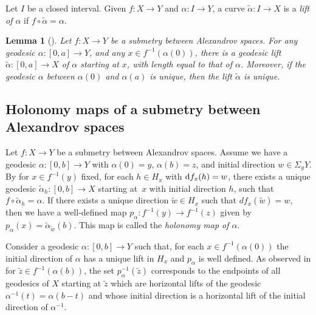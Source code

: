 \documentclass[pdftex]{sigma}
\numberwithin{equation}{section}
\newtheorem{lem}[thm]{Lemma}
\theoremstyle{definition}
\begin{document}
Let $I$ be a closed interval. Given $f\colon X	\to Y$ and $\alpha\colon I\to Y$, a curve $\tilde{\alpha}\colon I\to X$ is a \emph{lift of $\alpha$} if $f\circ\tilde{\alpha}= \alpha$.

\begin{lem}[]
\label{L: Existence and uniqueness of lifts of geodesics}
Let $f\colon X \to Y$ be a submetry between Alexandrov spaces. For any geodesic $\alpha\colon [0, a] \to Y$, and any $x \in f^{-1}(\alpha(0))$, there is a geodesic lift $\tilde{\alpha}\colon [0, a] \to X$ of $\alpha$ starting at $x$, with length equal to that of $\alpha$. Moreover, if the geodesic $\alpha$ between $\alpha(0)$ and $\alpha(a)$ is unique, then the lift $\tilde{\alpha}$ is unique.
\end{lem}

\subsection{Holonomy maps of a submetry between Alexandrov spaces}\label{S: Holonomy of submetries}

Let $f\colon X\to Y$ be a submetry between Alexandrov spaces. Assume we have a geodesic $\alpha\colon [0,b]\to Y$ with $\alpha(0)=y$, $\alpha(b)=z$, and initial direction $w\in \Sigma_y Y$. By \cite[Lemma 5.4]{Lytchak} for $x\in f^{-1}(y)$ fixed, for each $h\in H_x$ with ${\rm d} f_x(h)=w$, there exists a unique geodesic $\tilde{\alpha}_{h}\colon [0,b]\to X$ starting at~$x$ with initial direction $h$, such that $f\circ\tilde{\alpha}_{h} = \alpha$.
If there exists a unique direction $\tilde{w}\in H_x$ such that $d f_x(\tilde{w})=w$, then we have a well-defined map $p_\alpha\colon f^{-1}(y)\to f^{-1}(z)$ given by
$
p_\alpha(x) = \tilde{\alpha}_{\tilde{w}}(b)$.
This map is called the \emph{holonomy map of $\alpha$}.


Consider a geodesic $\alpha\colon [0,b]\to Y$ such that, for each $x\in f^{-1}(\alpha(0))$ the initial direction of $\alpha$ has a unique lift in $H_x$ and $p_\alpha$ is well defined. As observed in \cite[Section 7.3]{Lytchak} for $\tilde{z}\in f^{-1}(\alpha(b))$, the set $p^{-1}_\alpha(\tilde{z})$ corresponds to the endpoints of all geodesics of $X$ starting at $\tilde{z}$ which are horizontal lifts of the geodesic $\alpha^{-1}(t)=\alpha(b-t)$ and whose initial direction is a horizontal lift of the initial direction of $\alpha^{-1}$.
\end{document}
